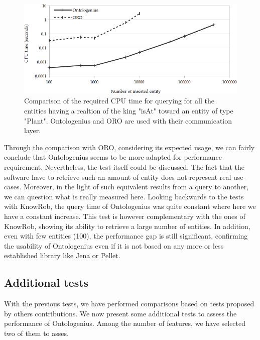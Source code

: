 \begin{figure}[ht!]
\centering
\includegraphics[width=\textwidth]{figures/chapter2/oro/R2.png}
\caption{\label{fig:chap2_oro_r2} Comparison of the required CPU time for querying for all the entities having a realtion of the king "isAt" toward an entity of type "Plant". Ontologenius and ORO are used with their communication layer.}
\end{figure}

Through the comparison with ORO, considering its expected usage, we can fairly conclude that Ontologenius seems to be more adapted for performance requirement. Nevertheless, the test itself could be discussed. The fact that the software have to retrieve such an amount of entity does not represent real use-cases. Moreover, in the light of such equivalent results from a query to another, we can question what is really measured here. Looking backwards to the tests with KnowRob, the query time of Ontologenius was quite constant where here we have a constant increase. This test is however complementary with the ones of KnowRob, showing its ability to retrieve a large number of entities. In addition, even with few entities (100), the performance gap is still significant, confirming the usability of Ontologenius even if it is not based on any more or less established library like Jena or Pellet. 

\subsection{Additional tests}

With the previous tests, we have performed comparisons based on tests proposed by others contributions. We now present some additional tests to assess the performance of Ontologenius. Among the number of features, we have selected two of them to asses.

